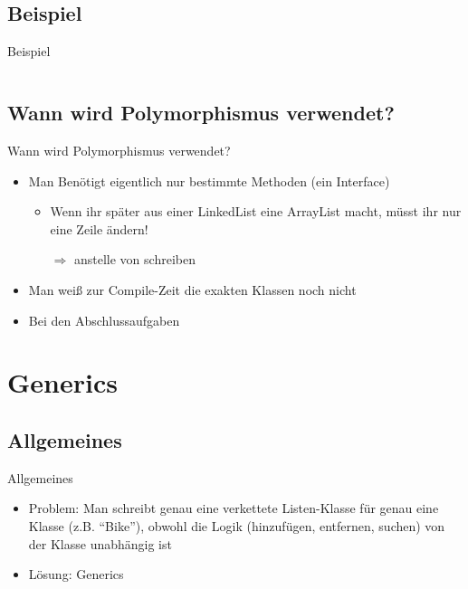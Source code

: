 \documentclass[usepdftitle=false,hyperref={pdfpagelabels=false}]{beamer}
\begin{document}
\subsection{Beispiel}
\begin{frame}{Beispiel}
    \inputminted[linenos=true, numbersep=5pt, tabsize=4, fontsize=\small]{java}{LateBinding.java}
\end{frame}

\subsection{Wann wird Polymorphismus verwendet?}
\begin{frame}{Wann wird Polymorphismus verwendet?}
    \begin{itemize}[<+->]
        \item Man Benötigt eigentlich nur bestimmte Methoden (ein Interface)
              \begin{itemize}[<+->]
                \item Wenn ihr später aus einer LinkedList eine ArrayList macht, müsst ihr nur eine Zeile ändern!
                \item[$\Rightarrow$]  anstelle von  schreiben
              \end{itemize}
        \item Man weiß zur Compile-Zeit die exakten Klassen noch nicht
        \item Bei den Abschlussaufgaben
    \end{itemize}
\end{frame}

\section{Generics}
\subsection{Allgemeines}
\begin{frame}{Allgemeines}
    \begin{itemize}
        \item Problem: Man schreibt genau eine verkettete Listen-Klasse
              für genau eine Klasse (z.B. "`Bike"'), obwohl
              die Logik (hinzufügen, entfernen, suchen) von der 
              Klasse unabhängig ist
        \item Lösung: Generics
    \end{itemize}
\end{frame}
\end{document}
